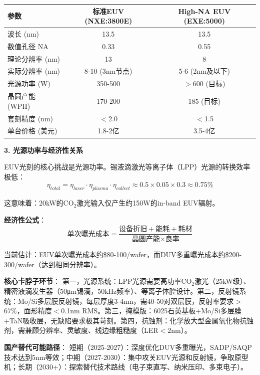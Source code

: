\begin{table}[H]
\centering
\small
\begin{tabular}{lcc}
\toprule
\textbf{参数} & \textbf{标准EUV (NXE:3800E)} & \textbf{High-NA EUV (EXE:5000)} \\
\midrule
波长 (nm) & 13.5 & 13.5 \\
数值孔径 NA & 0.33 & 0.55 \\
理论分辨率 (nm) & 13 & 8 \\
实际分辨率 (nm) & 8-10 (3nm节点) & 5-6 (2nm及以下) \\
光源功率 (W) & 350-500 & $>$600 (目标) \\
晶圆产能 (WPH) & 170-200 & 185 (目标) \\
套刻精度 (nm) & $<$2.0 & $<$1.5 \\
单台价格 (美元) & 1.8-2亿 & 3.5-4亿 \\
\bottomrule
\end{tabular}
\end{table}

\textbf{3. 光源功率与经济性关系}

EUV光刻的核心挑战是光源功率。锡液滴激光等离子体（LPP）光源的转换效率极低：
\begin{equation}
\eta_{total} = \eta_{laser} \cdot \eta_{plasma} \cdot \eta_{collect} \approx 0.5 \times 0.05 \times 0.3 \approx 0.75\%
\end{equation}

这意味着：20kW的CO$_2$激光输入仅产生约150W的in-band EUV辐射。

\textbf{经济性公式}：
\begin{equation}
\text{单次曝光成本} = \frac{\text{设备折旧} + \text{能耗} + \text{耗材}}{\text{晶圆产能} \times \text{良率}}
\end{equation}

当前估计：EUV单次曝光成本约\$80-100/wafer，而DUV多重曝光成本约\$200-300/wafer（达到相同分辨率）。

\textbf{核心卡脖子环节}：
第一，光源系统：LPP光源需要高功率CO$_2$激光（25kW级）、精密液滴发生器（50μm锡滴，50kHz频率）、等离子体腔设计。第二，反射镜系统：Mo/Si多层膜反射镜，每层厚度3-4nm，需40-50对双层膜，反射率要求$>$67\%，面形精度$<$0.1nm RMS。第三，掩模版：6025石英基板+Mo/Si多层膜+TaN吸收层，无缺陷要求极其苛刻。第四，抗蚀剂：化学放大型金属氧化物抗蚀剂，需兼顾分辨率、灵敏度、线边缘粗糙度（LER$<$2nm）。

\textbf{国产替代可能路径}：
短期（2025-2027）：深度优化DUV多重曝光，SADP/\allowbreak SAQP技术达到5nm等效；中期（2027-2030）：集中攻关EUV光源和反射镜，争取原型机；长期（2030+）：探索替代技术路线（电子束直写、纳米压印、多束电子）。

